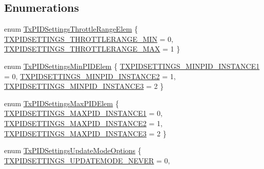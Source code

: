 \subsection*{\-Enumerations}
\begin{DoxyCompactItemize}
\item 
enum \hyperlink{group___tx_p_i_d_settings_ga3ebee2eee09fa6bc90834d4274de63ce}{\-Tx\-P\-I\-D\-Settings\-Throttle\-Range\-Elem} \{ \hyperlink{group___tx_p_i_d_settings_gga3ebee2eee09fa6bc90834d4274de63ceab3d6d1e6b3443c2fe3c566c024052c16}{\-T\-X\-P\-I\-D\-S\-E\-T\-T\-I\-N\-G\-S\-\_\-\-T\-H\-R\-O\-T\-T\-L\-E\-R\-A\-N\-G\-E\-\_\-\-M\-I\-N} = 0, 
\hyperlink{group___tx_p_i_d_settings_gga3ebee2eee09fa6bc90834d4274de63cea82ed2b2061a59f3db6b31318ab3dc21a}{\-T\-X\-P\-I\-D\-S\-E\-T\-T\-I\-N\-G\-S\-\_\-\-T\-H\-R\-O\-T\-T\-L\-E\-R\-A\-N\-G\-E\-\_\-\-M\-A\-X} = 1
 \}
\item 
enum \hyperlink{group___tx_p_i_d_settings_gaf51efa8c22cd73cfc68dbc12e8650dff}{\-Tx\-P\-I\-D\-Settings\-Min\-P\-I\-D\-Elem} \{ \hyperlink{group___tx_p_i_d_settings_ggaf51efa8c22cd73cfc68dbc12e8650dffa395cfa2bdfa722646d2911d0f8bf2b86}{\-T\-X\-P\-I\-D\-S\-E\-T\-T\-I\-N\-G\-S\-\_\-\-M\-I\-N\-P\-I\-D\-\_\-\-I\-N\-S\-T\-A\-N\-C\-E1} = 0, 
\hyperlink{group___tx_p_i_d_settings_ggaf51efa8c22cd73cfc68dbc12e8650dffae5587d71ff262a327cbc92928970761e}{\-T\-X\-P\-I\-D\-S\-E\-T\-T\-I\-N\-G\-S\-\_\-\-M\-I\-N\-P\-I\-D\-\_\-\-I\-N\-S\-T\-A\-N\-C\-E2} = 1, 
\hyperlink{group___tx_p_i_d_settings_ggaf51efa8c22cd73cfc68dbc12e8650dffadbb5ea164e9675c8234affa660168965}{\-T\-X\-P\-I\-D\-S\-E\-T\-T\-I\-N\-G\-S\-\_\-\-M\-I\-N\-P\-I\-D\-\_\-\-I\-N\-S\-T\-A\-N\-C\-E3} = 2
 \}
\item 
enum \hyperlink{group___tx_p_i_d_settings_gad9228305bd35acca365da9e45d935b00}{\-Tx\-P\-I\-D\-Settings\-Max\-P\-I\-D\-Elem} \{ \hyperlink{group___tx_p_i_d_settings_ggad9228305bd35acca365da9e45d935b00a4c3031bf436d0d8277da93169aa6e5ed}{\-T\-X\-P\-I\-D\-S\-E\-T\-T\-I\-N\-G\-S\-\_\-\-M\-A\-X\-P\-I\-D\-\_\-\-I\-N\-S\-T\-A\-N\-C\-E1} = 0, 
\hyperlink{group___tx_p_i_d_settings_ggad9228305bd35acca365da9e45d935b00af002899c27fd40cb3f49183aa51fda75}{\-T\-X\-P\-I\-D\-S\-E\-T\-T\-I\-N\-G\-S\-\_\-\-M\-A\-X\-P\-I\-D\-\_\-\-I\-N\-S\-T\-A\-N\-C\-E2} = 1, 
\hyperlink{group___tx_p_i_d_settings_ggad9228305bd35acca365da9e45d935b00a2b0625ac05d50466af181bd7afa2b443}{\-T\-X\-P\-I\-D\-S\-E\-T\-T\-I\-N\-G\-S\-\_\-\-M\-A\-X\-P\-I\-D\-\_\-\-I\-N\-S\-T\-A\-N\-C\-E3} = 2
 \}
\item 
enum \hyperlink{group___tx_p_i_d_settings_gab1f5f1bddd5a36c4ea73b40f917d8118}{\-Tx\-P\-I\-D\-Settings\-Update\-Mode\-Options} \{ \hyperlink{group___tx_p_i_d_settings_ggab1f5f1bddd5a36c4ea73b40f917d8118a04819678afafdf9581230ab09ec08128}{\-T\-X\-P\-I\-D\-S\-E\-T\-T\-I\-N\-G\-S\-\_\-\-U\-P\-D\-A\-T\-E\-M\-O\-D\-E\-\_\-\-N\-E\-V\-E\-R} = 0, 

\end{DoxyCompactItemize}
